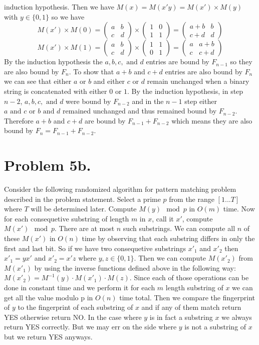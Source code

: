 \documentclass[12pt]{article}
\begin{document}
induction hypothesis. Then we have
$M(x) = M(x'y) = M(x') \times M(y)$ with $y\in \{0,1\}$ so we have
$$M(x') \times M(0) =
\left(\begin{array}{cc} a & b \\ c & d \end{array}\right) \times
\left(\begin{array}{cc} 1 & 0 \\ 1 & 1 \end{array}\right) =
\left(\begin{array}{cc} a+b & b \\ c+d & d \end{array}\right)$$
$$M(x') \times M(1) =
\left(\begin{array}{cc} a & b \\ c & d \end{array}\right) \times
\left(\begin{array}{cc} 1 & 1 \\ 0 & 1 \end{array}\right) =
\left(\begin{array}{cc} a & a+b \\ c & c+d \end{array}\right)$$
By the induction hypothesis the $a,b,c, \text{ and } d$ entries are bound by
$F_{n-1}$ so they are also bound by $F_n$. To show that $a+b$ and $c+d$ entries
are also bound by $F_n$ we can see that either $a$ or $b$ and either $c$ or $d$
remain unchanged when a binary string is concatenated with either $0$ or $1$.
By the induction hypothesis, in step $n-2$, $a, b, c, \text{ and } d$ were bound
by $F_{n-2}$ and in the $n-1$ step either $a \text{ and } c \text{ or }
b \text{ and } d$ remained unchanged and thus remained bound by $F_{n-2}$.
Therefore $a+b$ and $c+d$ are bound by $F_{n-1} + F_{n-2}$ which means they are
also bound by $F_n = F_{n-1} + F_{n-2}$.

\section*{Problem 5b.}
Consider the following randomized algorithm for pattern matching problem
described in the problem statement. Select a prime $p$ from the range $[1...T]$
where $T$ will be determined later. Compute $M(y)\mod p$ in $O(m)$ time. Now
for each consequetive substring of length $m$ in $x$, call it $x'$, compute
$M(x')\mod p$. There are at most $n$ such substrings. We can compute all
$n$ of these $M(x')$ in $O(n)$ time by observing that each substring differs in
only the first and last bit. So if we have two consequetive substrings $x'_1$
and $x'_2$ then $x'_1 = yx'$ and $x'_2 = x'z$ where $y,z\in\{0,1\}$. Then
we can compute $M(x'_2)$ from $M(x'_1)$ by using the inverse functions defined
above in the following way: $M(x'_2) = M^{-1}(y)\cdot M(x'_1)\cdot M(z)$. Since
each of those operations can be done in constant time and we perform it for each
$m$ length substring of $x$ we can get all the value modulo p in $O(n)$ time
total. Then we compare the fingerprint of $y$ to the fingerprint of each
substring of $x$ and if any of them match return YES otherwise return NO. In
the case where $y$ is in fact a substring $x$ we always return YES correctly. But
we may err on the side where $y$ is not a substring of $x$ but we return YES
anyways. 
\end{document}

